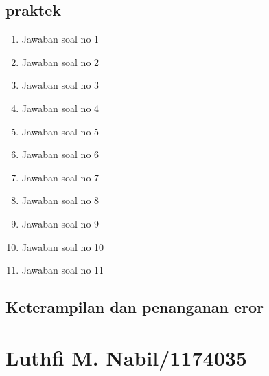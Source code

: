 \subsection{praktek}
\begin{enumerate}
    \item Jawaban soal no 1
    
    \item Jawaban soal no 2
    
    \item Jawaban soal no 3
    
    \item Jawaban soal no 4
    
    \item Jawaban soal no 5
    
    \item Jawaban soal no 6
    
    \item Jawaban soal no 7
    
    \item Jawaban soal no 8
    
    \item Jawaban soal no 9
    
    \item Jawaban soal no 10
    
    \item Jawaban soal no 11
    
\end{enumerate}

\subsection{Keterampilan dan penanganan eror}
    


\section{Luthfi M. Nabil/1174035}
